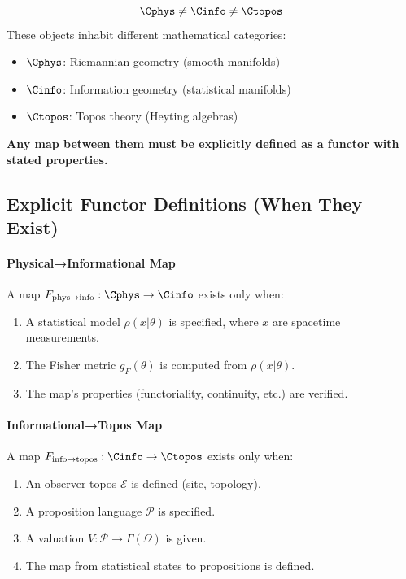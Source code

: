 \begin{tcolorbox}[colback=red!5!white,colframe=red!75!black,title=Critical Notation Rule]
\[
\Cphys \neq \Cinfo \neq \Ctopos
\]
These objects inhabit different mathematical categories:
\begin{itemize}
    \item $\Cphys$: Riemannian geometry (smooth manifolds)
    \item $\Cinfo$: Information geometry (statistical manifolds) 
    \item $\Ctopos$: Topos theory (Heyting algebras)
\end{itemize}
\textbf{Any map between them must be explicitly defined as a functor with stated properties.}
\end{tcolorbox}

\subsection{Explicit Functor Definitions (When They Exist)}

\paragraph{Physical→Informational Map}
A map $F_{\mathrm{phys\to info}}: \Cphys \to \Cinfo$ exists only when:
\begin{enumerate}
    \item A statistical model $\rho(x|\theta)$ is specified, where $x$ are spacetime measurements.
    \item The Fisher metric $g_F(\theta)$ is computed from $\rho(x|\theta)$.
    \item The map's properties (functoriality, continuity, etc.) are verified.
\end{enumerate}

\paragraph{Informational→Topos Map}  
A map $F_{\mathrm{info\to topos}}: \Cinfo \to \Ctopos$ exists only when:
\begin{enumerate}
    \item An observer topos $\mathcal{E}$ is defined (site, topology).
    \item A proposition language $\mathcal{P}$ is specified.
    \item A valuation $V: \mathcal{P} \to \Gamma(\Omega)$ is given.
    \item The map from statistical states to propositions is defined.
\end{enumerate}


